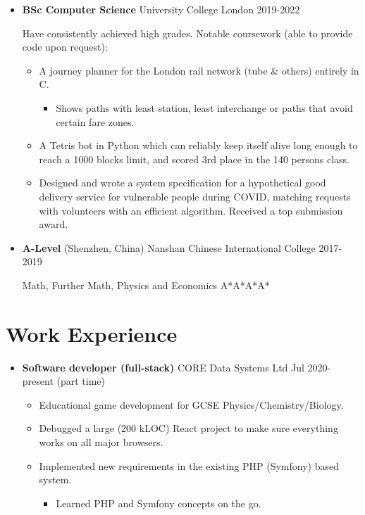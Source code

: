   \begin{itemize}
    \item \textbf{BSc Computer Science} \dashdiv{} University College London \dashdiv{} 2019-2022

      Have consistently achieved high grades. Notable coursework (able to provide code upon request):

      \begin{itemize}
        \item A journey planner for the\tflicon{} London rail network (tube \& others) entirely in C.

        \begin{itemize}
          \item Shows paths with least station, least interchange or paths that avoid certain fare zones.
        \end{itemize}

        \item A Tetris bot in Python which can reliably keep itself alive long enough to reach a 1000 blocks limit, and scored 3rd place in the 140 persons class.

        \item Designed and wrote a system specification for a hypothetical good delivery service for vulnerable people during COVID, matching requests with volunteers with an efficient algorithm. Received a top submission award.
      \end{itemize}

    \item \textbf{A-Level} \dashdiv{} (Shenzhen, China) Nanshan Chinese International College \dashdiv{} 2017-2019

      Math, Further Math, Physics and Economics \dashdiv{} A*A*A*A*
  \end{itemize}

  \section{Work Experience}

  \begin{itemize}
    \item \textbf{Software developer (full-stack)} \dashdiv{} CORE Data Systems Ltd \dashdiv{} Jul 2020-present (part time)

    \begin{itemize}
      \item Educational game development for GCSE Physics/Chemistry/Biology.
      \item Debugged a large (200 kLOC) React project to make sure everything works on all major browsers.
      \item Implemented new requirements in the existing PHP (Symfony) based system.
      \begin{itemize}
        \item Learned PHP and Symfony concepts on the go.
      \end{itemize}
    \end{itemize}
  \end{itemize}

